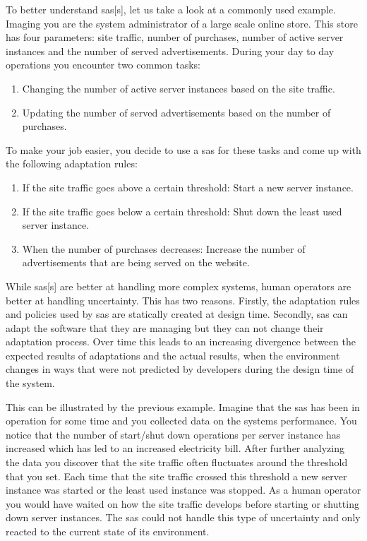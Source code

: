 \noindent To better understand \acrlong{sas}[s], let us take a look at a commonly used example.
Imaging you are the system administrator of a large scale online store.
This store has four parameters: site traffic, number of purchases, number of active server instances and the number of served advertisements.
During your day to day operations you encounter two common tasks:
\begin{enumerate}[nosep]
    \item Changing the number of active server instances based on the site traffic.
    \item Updating the number of served advertisements based on the number of purchases.
\end{enumerate}
To make your job easier, you decide to use a \acrlong{sas} for these tasks and come up with the following adaptation rules:
\begin{enumerate}[nosep]
    \item If the site traffic goes above a certain threshold: Start a new server instance.
    \item If the site traffic goes below a certain threshold: Shut down the least used server instance.
    \item When the number of purchases decreases: Increase the number of advertisements that are being served on the website.
\end{enumerate}

\noindent While \acrlong{sas}[s] are better at handling more complex systems,
human operators are better at handling uncertainty.
This has two reasons. 
Firstly, the adaptation rules and policies used by \acrshort{sas} are statically created at design time.
Secondly, \acrshort{sas} can adapt the software that they are managing but they can not change their adaptation process.
Over time this leads to an increasing divergence between the expected results of adaptations and the actual results,
when the environment changes in ways that were not predicted by developers during the design time of the system.

\noindent This can be illustrated by the previous example.
Imagine that the \acrlong{sas} has been in operation for some time and you collected data on the systems performance.
You notice that the number of start/shut down operations per server instance has increased 
which has led to an increased electricity bill.
After further analyzing the data you discover that the site traffic often fluctuates around the threshold that you set.
Each time that the site traffic crossed this threshold a new server instance was started or the least used instance was stopped.
As a human operator you would have waited on how the site traffic develops before starting or shutting down server instances.
The \acrshort{sas} could not handle this type of uncertainty and only reacted to the current state of its environment.

